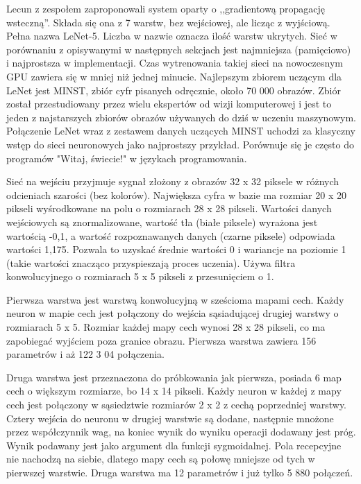 \documentclass[12pt,a4paper,twoside,titlepage,openright]{book}
\begin{document}
Lecun z zespołem zaproponowali system oparty o ,,gradientową propagację wsteczną''. Składa się ona z 7 warstw, bez wejściowej, ale licząc z wyjściową. Pełna nazwa LeNet-5. Liczba w nazwie oznacza ilość warstw ukrytych. Sieć w porównaniu z opisywanymi w następnych sekcjach jest najmniejsza (pamięciowo) i najprostsza w implementacji. Czas wytrenowania takiej sieci na nowoczesnym GPU zawiera się w mniej niż jednej minucie. Najlepszym zbiorem uczącym dla LeNet jest MINST, zbiór cyfr pisanych odręcznie, około 70 000 obrazów. Zbiór został przestudiowany przez wielu ekspertów od wizji komputerowej i jest to jeden z najstarszych zbiorów obrazów używanych do dziś w uczeniu maszynowym. Połączenie LeNet wraz z zestawem danych uczących MINST uchodzi za klasyczny wstęp do sieci neuronowych jako najprostszy przykład. Porównuje się je często do programów "Witaj, świecie!" w językach programowania.

Sieć na wejściu przyjmuje sygnał złożony z obrazów 32 x 32 piksele w różnych odcieniach szarości (bez kolorów). Największa cyfra w bazie ma rozmiar 20 x 20 pikseli wyśrodkowane na polu o rozmiarach 28 x 28 pikseli. Wartości danych wejściowych są znormalizowane, wartość tła (białe piksele) wyrażona jest wartością -0,1, a wartość rozpoznawanych danych (czarne piksele) odpowiada wartości 1,175. Pozwala to uzyskać średnie wartości 0 i wariancje na poziomie 1 (takie wartości znacząco przyspieszają proces uczenia). Używa filtra konwolucyjnego o rozmiarach 5 x 5 pikseli z przesunięciem o 1.

Pierwsza warstwa jest warstwą konwolucyjną w sześcioma mapami cech. Każdy neuron w mapie cech jest połączony do wejścia sąsiadującej drugiej warstwy o rozmiarach 5 x 5. Rozmiar każdej mapy cech wynosi 28 x 28 pikseli, co ma zapobiegać wyjściem poza granice obrazu. Pierwsza warstwa zawiera 156 parametrów i aż 122 3 04 połączenia.

Druga warstwa jest przeznaczona do próbkowania jak pierwsza, posiada 6 map cech o większym rozmiarze, bo 14 x 14 pikseli. Każdy neuron w każdej z mapy cech jest połączony w sąsiedztwie rozmiarów 2 x 2 z cechą poprzedniej warstwy. Cztery wejścia do neuronu w drugiej warstwie są dodane, następnie mnożone przez współczynnik wag, na koniec wynik do wyniku operacji dodawany jest próg. Wynik podawany jest jako argument dla funkcji sygmoidalnej. Pola recepcyjne nie nachodzą na siebie, dlatego mapy cech są połowę mniejsze od tych w pierwszej warstwie. Druga warstwa ma 12 parametrów i już tylko 5 880 połączeń.
\end{document}
